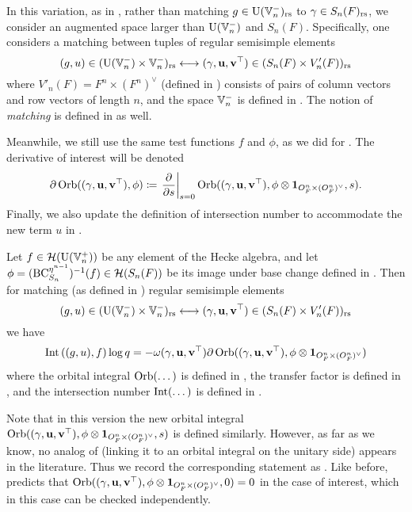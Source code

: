In this variation, as in \cite{ref:liuFJ},
rather than matching $g \in \operatorname{U}(\mathbb V_n^-)_{\mathrm{rs}}$ to $\gamma \in S_n(F)_{\mathrm{rs}}$,
we consider an augmented space larger than $\operatorname{U}(\mathbb V_n^-)$ and $S_n(F)$.
Specifically, one considers a matching between tuples of regular semisimple elements
\[ (g, u) \in (\operatorname{U}(\mathbb V_n^-) \times \mathbb V_n^-)_{\mathrm{rs}}
  \longleftrightarrow (\gamma, \mathbf u, \mathbf v^\top) \in (S_n(F) \times V'_n(F))_{\mathrm{rs}} \]
where $V'_n(F) = F^n \times (F^n)^\vee$ (defined in )
consists of pairs of column vectors and row vectors of length $n$,
and the space $\mathbb V_n^-$ is defined in .
The notion of \emph{matching} is defined in  as well.

Meanwhile, we still use the same test functions $f$ and $\phi$,
as we did for \cite[Conjecture 6.2.1]{ref:AFLspherical}.
The derivative of interest will be denoted
\[ \partial \operatorname{Orb}({(\gamma, \mathbf u, \mathbf v^\top)}, \phi) \coloneqq
  \left. \pdv{}{s} \right\rvert_{s=0}
  \operatorname{Orb}((\gamma, \mathbf u, \mathbf v^\top), \phi \otimes \mathbf{1}_{O_F^n \times (O_F^n)^\vee}, s). \]
Finally, we also update the definition of intersection number
to accommodate the new term $u$ in .
\begin{conjecture}
  Let $f \in \mathcal H(\operatorname{U}(\mathbb V_n^+))$ be any element of the Hecke algebra,
  and let $\phi = (\operatorname{BC}_{S_n}^{\eta^{n-1}})^{-1}(f) \in \mathcal H(S_n(F))$ be its image
  under base change defined in .
  Then for matching (as defined in ) regular semisimple elements
  \[ (g, u) \in (\operatorname{U}(\mathbb V_n^-) \times \mathbb V_n^-)_{\mathrm{rs}} \longleftrightarrow
    {(\gamma, \mathbf u, \mathbf v^\top)} \in (S_n(F) \times V'_n(F))_{\mathrm{rs}} \]
  we have
  \begin{equation}
    \operatorname{Int}\left( (g,u), f \right) \log q \\
    = -\omega{(\gamma, \mathbf u, \mathbf v^\top)} \partial \operatorname{Orb}({(\gamma, \mathbf u, \mathbf v^\top)}, \phi \otimes \mathbf{1}_{O_F^n \times (O_F^n)^\vee})
  \end{equation}
  where the orbital integral $\operatorname{Orb}(\dots)$ is defined in ,
  the transfer factor is defined in ,
  and the intersection number $\operatorname{Int}(\dots)$ is defined in .
  \label{conj:semi_lie_spherical}
\end{conjecture}
Note that in this version the new orbital integral $\operatorname{Orb}({(\gamma, \mathbf u, \mathbf v^\top)}, \phi \otimes \mathbf{1}_{O_F^n \times (O_F^n)^\vee}, s)$
is defined similarly.
However, as far as we know, no analog of 
(linking it to an orbital integral on the unitary side) appears in the literature.
Thus we record the corresponding statement as .
Like before, 
predicts that $\operatorname{Orb}({(\gamma, \mathbf u, \mathbf v^\top)}, \phi \otimes \mathbf{1}_{O_F^n \times (O_F^n)^\vee}, 0) = 0$ in the case of interest,
which in this case can be checked independently.

